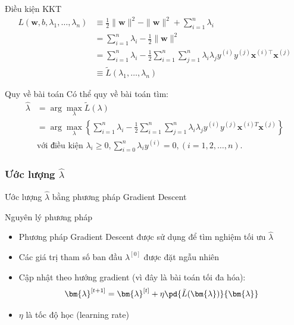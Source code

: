 \documentclass[serif, aspectratio=169]{beamer}
\begin{document}
	\begin{frame}{Điều kiện KKT}
		\begin{align*}
			L(\bm{w}, b, \lambda_1, \dots, \lambda_n) &\equiv \frac{1}{2}\|\bm{w}\|^2 -\| \bm{w} \|^2 + \sum_{i=1}^n \lambda_i \\
			&= \sum_{i=1}^n \lambda_i -\frac{1}{2}\|\bm{w}\|^2 \\
			&= \sum_{i=1}^n \lambda_i - \frac{1}{2} \sum_{i=1}^{n} \sum_{j=1}^{n} \lambda_{i} \lambda_{j} y^{(i)} y^{(j)}\bm{x}^{(i)\top}\bm{x}^{(j)} \\
			&\equiv \tilde{L}(\lambda_1, \dots, \lambda_n) \label{eq:L_tilde}
		\end{align*}
	\end{frame}
	
	\begin{frame}{Quy về bài toán}
		Có thể quy về bài toán tìm:
		\begin{align*}
			\hat{\lambda} &= \arg\max_{\lambda} \tilde{L}(\lambda) \\
			&= \arg\max_{\lambda} \left\{\sum_{i=1}^n \lambda_i - \frac{1}{2}\sum_{i=1}^n \sum_{j=1}^n \lambda_i \lambda_j y^{(i)}y^{(j)}\mathbf{x}^{(i)T}\mathbf{x}^{(j)}\right\} \\
			&\text{với điều kiện } \lambda_i \geq 0, \sum_{i=0}^n \lambda_i y^{(i)} = 0, (i=1,2,\ldots,n).
		\end{align*}
	\end{frame}
	\subsubsection{Ước lượng $\hat{\lambda}$}
	\begin{frame}{Ước lượng $\hat{\lambda}$ bằng phương pháp Gradient Descent}
		\begin{block}{Nguyên lý phương pháp}
			\begin{itemize}
				\item Phương pháp Gradient Descent được sử dụng để tìm nghiệm tối ưu $\hat{\lambda}$
				\item Các giá trị tham số ban đầu $\lambda^{[0]}$ được đặt ngẫu nhiên
				\item Cập nhật theo hướng gradient (vì đây là bài toán tối đa hóa):
				\[\bm{\lambda}^{[t+1]} = \bm{\lambda}^{[t]} + \eta \pd{\tilde{L}(\bm{\lambda})}{\bm{\lambda}}\]
				\item $\eta$ là tốc độ học (learning rate)
			\end{itemize}
		\end{block}
	\end{frame}
	
\end{document}
